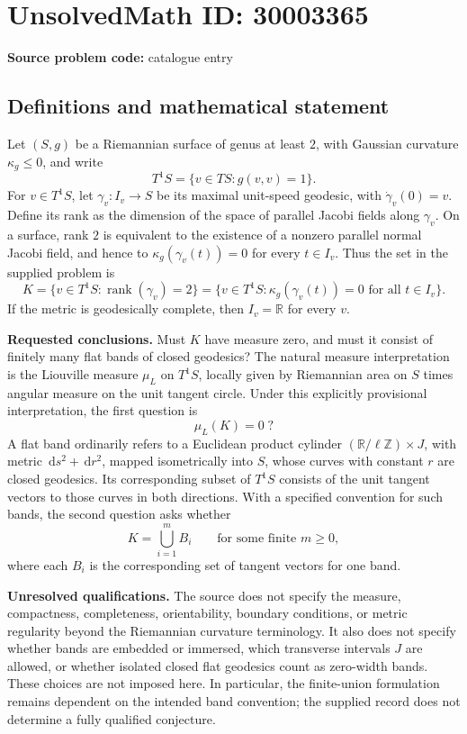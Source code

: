 \documentclass[11pt]{article}
\newcommand{\Z}{\mathbb{Z}}
\newcommand{\R}{\mathbb{R}}
\newcommand{\dd}{\,\mathrm{d}}
\begin{document}
\section*{UnsolvedMath ID: 30003365}
\textbf{Source problem code:} catalogue entry
\subsection{Definitions and mathematical statement}
Let \((S,g)\) be a Riemannian surface of genus at least \(2\), with Gaussian curvature \(\kappa_g\leq 0\), and write
\[
T^1S=\{v\in TS:g(v,v)=1\}.
\]
For \(v\in T^1S\), let \(\gamma_v:I_v\to S\) be its maximal unit-speed geodesic, with \(\dot\gamma_v(0)=v\). Define its rank as the dimension of the space of parallel Jacobi fields along \(\gamma_v\). On a surface, rank \(2\) is equivalent to the existence of a nonzero parallel normal Jacobi field, and hence to \(\kappa_g(\gamma_v(t))=0\) for every \(t\in I_v\). Thus the set in the supplied problem is
\[
K=\{v\in T^1S:\operatorname{rank}(\gamma_v)=2\}
 =\{v\in T^1S:\kappa_g(\gamma_v(t))=0\text{ for all }t\in I_v\}.
\]
If the metric is geodesically complete, then \(I_v=\R\) for every \(v\).

\textbf{Requested conclusions.} Must \(K\) have measure zero, and must it consist of finitely many flat bands of closed geodesics? The natural measure interpretation is the Liouville measure \(\mu_L\) on \(T^1S\), locally given by Riemannian area on \(S\) times angular measure on the unit tangent circle. Under this explicitly provisional interpretation, the first question is
\[
\mu_L(K)=0\;?
\]
A flat band ordinarily refers to a Euclidean product cylinder \((\R/\ell\Z)\times J\), with metric \(\dd s^2+\dd r^2\), mapped isometrically into \(S\), whose curves with constant \(r\) are closed geodesics. Its corresponding subset of \(T^1S\) consists of the unit tangent vectors to those curves in both directions. With a specified convention for such bands, the second question asks whether
\[
K=\bigcup_{i=1}^{m}B_i
\qquad\text{for some finite }m\geq 0,
\]
where each \(B_i\) is the corresponding set of tangent vectors for one band.

\textbf{Unresolved qualifications.} The source does not specify the measure, compactness, completeness, orientability, boundary conditions, or metric regularity beyond the Riemannian curvature terminology. It also does not specify whether bands are embedded or immersed, which transverse intervals \(J\) are allowed, or whether isolated closed flat geodesics count as zero-width bands. These choices are not imposed here. In particular, the finite-union formulation remains dependent on the intended band convention; the supplied record does not determine a fully qualified conjecture.
\end{document}
